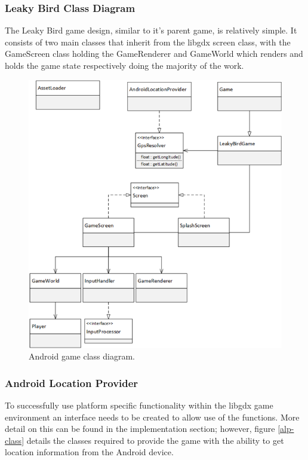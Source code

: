 \clearpage
\subsubsection{Leaky Bird Class Diagram}
The Leaky Bird game design, similar to it's parent game,  is relatively simple. It consists of two main classes that inherit from the libgdx screen class, with the GameScreen class holding the GameRenderer and GameWorld which renders and holds the game state respectively doing the majority of the work.

\begin{figure}[h!]
\centering\includegraphics[width=\linewidth]{design/figures/ag-cd.png}
\caption{Android game class diagram.}
\end{figure}
\clearpage
\subsubsection{Android Location Provider}
\label{design:ag-lp-cd}
To successfully use platform specific functionality within the libgdx game environment an interface needs to be created to allow use of the functions. More detail on this can be found in the implementation section; however, figure \ref{alp-class} details the classes required to provide the game with the ability to get location information from the Android device.

